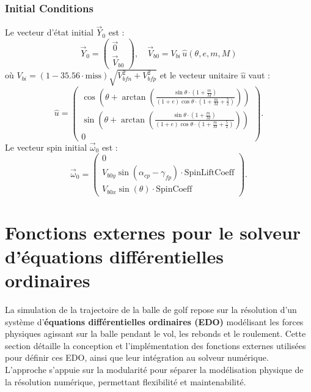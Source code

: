 \documentclass[10pt,a4paper]{report}
\begin{document}
\subsubsection{Initial Conditions}
Le vecteur d'état initial $\vec{Y}_0$ est :
\begin{equation}
    \vec{Y}_0 = \begin{pmatrix} \vec{0} \\ \vec{V}_{b0} \end{pmatrix}, \quad \vec{V}_{b0} = V_{bi} \, \hat{u}(\theta, e, m, M)
    \label{eq:tensor_initial}
\end{equation}
où $V_{bi} = (1 - 35.56 \cdot \text{miss}) \sqrt{V_{bfn}^2 + V_{bfp}^2}$ et le vecteur unitaire $\hat{u}$ vaut :
\begin{equation}
    \hat{u} = \begin{pmatrix}
    \cos\left( \theta + \arctan\left( \frac{\sin \theta \cdot (1 + \frac{m}{M})}{(1 + e) \cos \theta \cdot (1 + \frac{m}{M} + \frac{5}{2})} \right) \right) \\
    \sin\left( \theta + \arctan\left( \frac{\sin \theta \cdot (1 + \frac{m}{M})}{(1 + e) \cos \theta \cdot (1 + \frac{m}{M} + \frac{5}{2})} \right) \right) \\
    0
    \end{pmatrix}.
    \label{eq:tensor_direction}
\end{equation}
Le vecteur spin initial $\vec{\omega}_0$ est :
\begin{equation}
    \vec{\omega}_0 = \begin{pmatrix}
    0 \\
    V_{b0y} \sin(\alpha_{cp} - \gamma_{fp}) \cdot \text{SpinLiftCoeff} \\
    V_{b0x} \sin(\theta) \cdot \text{SpinCoeff}
    \end{pmatrix}.
    \label{eq:tensor_spin}
\end{equation}


\section{Fonctions externes pour le solveur d'équations différentielles ordinaires}
\label{sec:ode_functions}

La simulation de la trajectoire de la balle de golf repose sur la résolution d'un système d'\textbf{équations différentielles ordinaires (EDO)} modélisant les forces physiques agissant sur la balle pendant le vol, les rebonds et le roulement. Cette section détaille la conception et l'implémentation des fonctions externes utilisées pour définir ces EDO, ainsi que leur intégration au solveur numérique. L'approche s'appuie sur la modularité pour séparer la modélisation physique de la résolution numérique, permettant flexibilité et maintenabilité.
\end{document}
